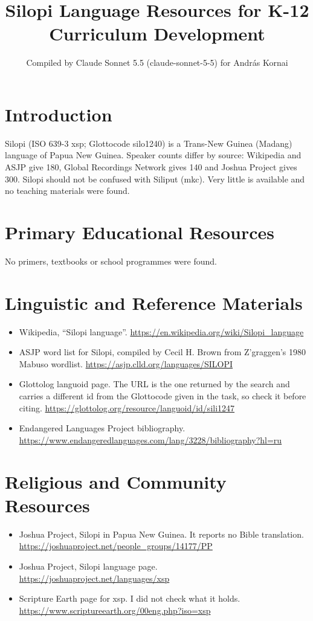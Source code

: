 \documentclass[12pt]{article}
\title{Silopi Language Resources for K-12 Curriculum Development}
\author{Compiled by Claude Sonnet 5.5 (claude-sonnet-5-5) for Andr\'as Kornai}
\date{}
\begin{document}
\maketitle

\section{Introduction}
Silopi (ISO 639-3 xsp; Glottocode silo1240) is a Trans-New Guinea (Madang) language of Papua New Guinea. Speaker counts differ by source: Wikipedia and ASJP give 180, Global Recordings Network gives 140 and Joshua Project gives 300. Silopi should not be confused with Siliput (mkc). Very little is available and no teaching materials were found.

\section{Primary Educational Resources}
No primers, textbooks or school programmes were found.

\section{Linguistic and Reference Materials}
\begin{itemize}
\item Wikipedia, ``Silopi language''. \url{https://en.wikipedia.org/wiki/Silopi_language}
\item ASJP word list for Silopi, compiled by Cecil H. Brown from Z'graggen's 1980 Mabuso wordlist. \url{https://asjp.clld.org/languages/SILOPI}
\item Glottolog languoid page. The URL is the one returned by the search and carries a different id from the Glottocode given in the task, so check it before citing. \url{https://glottolog.org/resource/languoid/id/sili1247}
\item Endangered Languages Project bibliography. \url{https://www.endangeredlanguages.com/lang/3228/bibliography?hl=ru}
\end{itemize}

\section{Religious and Community Resources}
\begin{itemize}
\item Joshua Project, Silopi in Papua New Guinea. It reports no Bible translation. \url{https://joshuaproject.net/people_groups/14177/PP}
\item Joshua Project, Silopi language page. \url{https://joshuaproject.net/languages/xsp}
\item Scripture Earth page for xsp. I did not check what it holds. \url{https://www.scriptureearth.org/00eng.php?iso=xsp}
\end{itemize}
\end{document}
